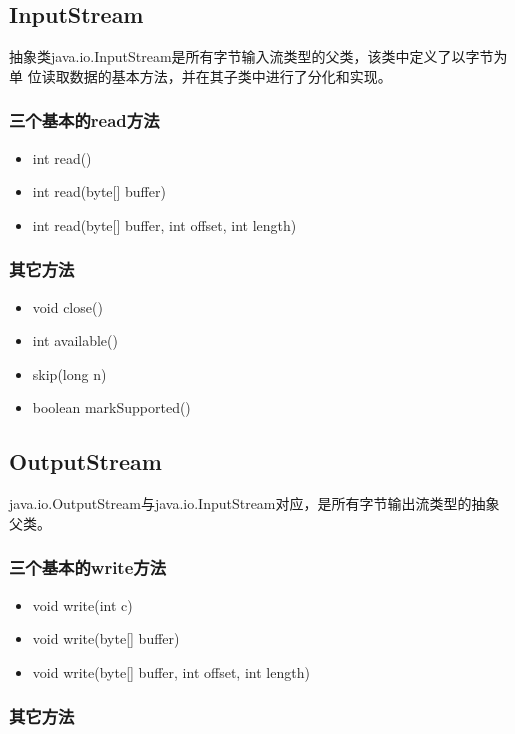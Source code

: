 \subsection{InputStream}

抽象类java.io.InputStream是所有字节输入流类型的父类，该类中定义了以字节为单
位读取数据的基本方法，并在其子类中进行了分化和实现。

\subsubsection{三个基本的read方法}

\begin{itemize}
\item int read()
\item int read(byte[] buffer)
\item int read(byte[] buffer, int offset, int length)
\end{itemize}

\subsubsection{其它方法}

\begin{itemize}
\item void close()
\item int available()
\item skip(long n)
\item boolean markSupported()
\end{itemize}

\subsection{OutputStream}

java.io.OutputStream与java.io.InputStream对应，是所有字节输出流类型的抽象父类。

\subsubsection{三个基本的write方法}

\begin{itemize}
\item void write(int c)
\item void write(byte[] buffer)
\item void write(byte[] buffer, int offset, int length)
\end{itemize}

\subsubsection{其它方法}

